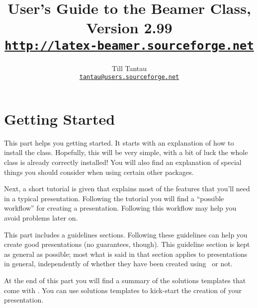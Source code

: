 \documentclass{ltxdoc}
\def\version{2.99}
\begin{document}

\title{User's Guide to the Beamer Class, Version \version\\
\Large\href{http://latex-beamer.sourceforge.net}{\texttt{http://latex-beamer.sourceforge.net}}}
\author{Till Tantau\\
  \href{mailto:tantau@users.sourceforge.net}{\texttt{tantau@users.sourceforge.net}}}

\maketitle

\tableofcontents






\part{Getting Started}

This part helps you getting started. It starts with an explanation of
how to install the class. Hopefully, this will be very simple, with a
bit of luck the whole class is already correctly installed! You will
also find an explanation of special things you should consider when
using certain other packages.

Next, a short tutorial is given that explains most of the features
that you'll need in a typical presentation. Following the tutorial you
will find a ``possible workflow'' for creating a
presentation. Following this workflow may help you avoid problems
later on.

This part includes a guidelines sections. Following these guidelines
can help you create good presentations (no guarantees, though). This
guideline section is kept as general as possible; most what is said in
that section applies to presentations in general, independently of
whether they have been created using \beamer\ or not.

At the end of this part you will find a summary of the solutions
templates that come with \beamer. You can use solutions templates to
kick-start the creation of your presentation.






\end{document}

